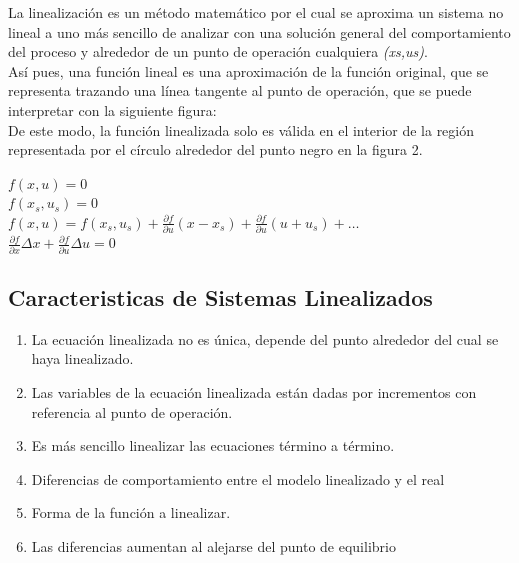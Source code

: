 \documentclass[a4paper,12pt,twoside]{proyectotanquesecci}
\begin{document}

La linealización es un método matemático por el cual se aproxima un sistema no lineal a uno más sencillo de analizar con una solución general del comportamiento del proceso y alrededor de un punto de operación cualquiera \textit{(xs,us)}.\\

Así pues, una función lineal es una aproximación de la función original, que se representa trazando una línea tangente al punto de operación, que se puede interpretar con la siguiente figura:\\


De este modo, la función linealizada solo es válida en el interior de la región representada por el círculo alrededor del punto negro en la figura 2.

\begin{center}
	$f\left( x,u\right)=0$ \\
	$f\left( x_{s},u_{s}\right) =0$ \\
	$f\left( x,u\right) = f\left( x_{s},u_{s}\right) +\frac {\partial f}{\partial u}\left( x-x_{s}\right) +\frac {\partial f}{\partial u}\left( u+u_{s}\right) +\ldots$ \\
	$\frac {\partial f}{\partial x}\Delta x+\frac {\partial f}{\partial u}\Delta u=0$
\end{center}

\subsection{Caracteristicas de Sistemas Linealizados}

\begin{enumerate}
\item La ecuación linealizada no es única, depende del punto alrededor del cual se haya linealizado.
\item Las variables de la ecuación linealizada están dadas por incrementos con referencia al punto de operación.
\item Es más sencillo linealizar las ecuaciones término a término.
\item Diferencias de comportamiento entre el modelo linealizado y el real
\item Forma de la función a linealizar.
\item Las diferencias aumentan al alejarse del punto de equilibrio 
\end{enumerate}
\end{document}
